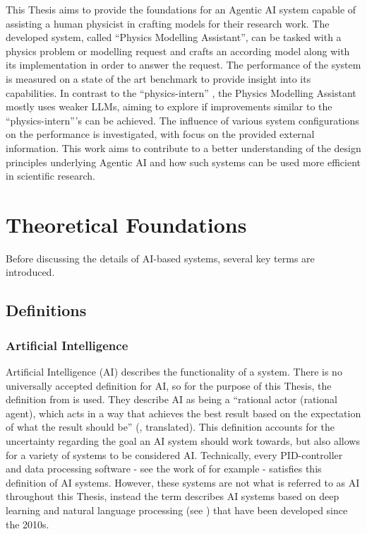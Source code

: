\documentclass[
	fontsize = 11pt,
	paper = a4,
	draft = false,
	twoside = true,
	titlepage = false
]{scrartcl}
\numberwithin{equation}{subsection}
\begin{document}
	This Thesis aims to provide the foundations for an \gls{Agentic AI} system capable of assisting a human physicist in crafting models for their research work. The developed system, called \enquote{Physics Modelling Assistant}, can be tasked with a physics problem or modelling request and crafts an according model along with its implementation in order to answer the request.
	The performance of the system is measured on a state of the art benchmark to provide insight into its capabilities. In contrast to the \enquote{physics-intern} \autocite{pIntern}, the Physics Modelling Assistant mostly uses weaker \gls{LLM}s, aiming to explore if improvements similar to the \enquote{physics-intern}'s \autocite{pIntern} can be achieved. The influence of various system configurations on the performance is investigated, with focus on the provided external information. This work aims to contribute to a better understanding of the design principles underlying \gls{Agentic AI} and how such systems can be used more efficient in scientific research.	
	\FloatBarrier
	\pagebreak
	\section{Theoretical Foundations}
	Before discussing the details of \gls{AI}-based systems, several key terms are introduced.
	
	\subsection{Definitions}
	
	\subsubsection{Artificial Intelligence} \label{subsub:ai}
	Artificial Intelligence (\gls{AI}) describes the functionality of a system. 
	There is no universally accepted definition for \gls{AI}, so for the purpose of this Thesis, the definition from \citeauthor{russell2023} \autocite[p.~22-26]{russell2023} is used. They describe \gls{AI} as being a \enquote{rational actor (rational agent), which acts in a way that achieves the best result based on the expectation of what the result should be} (\autocite[p.~26]{russell2023}, translated). This definition accounts for the uncertainty regarding the goal an \gls{AI} system should work towards, but also allows for a variety of systems to be considered \gls{AI}. Technically, every PID-controller and data processing software - see the work of \citeauthor{diplom} \autocite{diplom} for example - satisfies this definition of \gls{AI} systems. However, these systems are not what is referred to as \gls{AI} throughout this Thesis, instead the term describes \gls{AI} systems based on deep learning and natural language processing (see \autocite{aiHist_11202920}) that have been developed since the 2010s.
	
\end{document}
